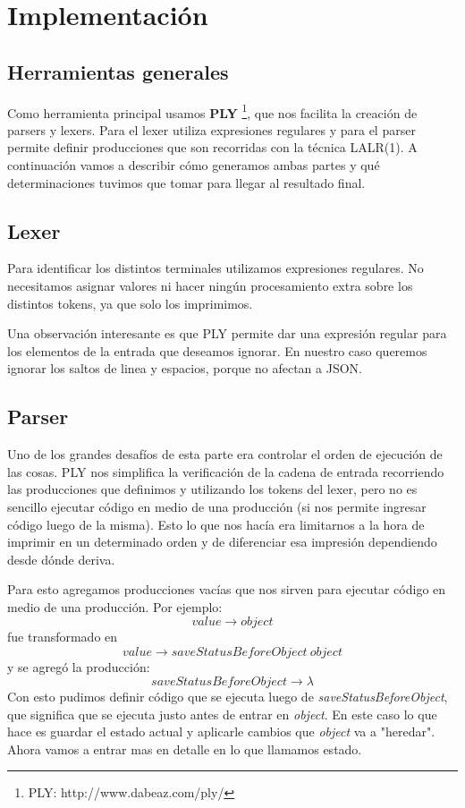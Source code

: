\section{Implementación}

\subsection{Herramientas generales}
Como herramienta principal usamos \textbf{PLY} \footnote{PLY: http://www.dabeaz.com/ply/}, que nos facilita la creación de parsers y lexers. Para el lexer utiliza expresiones regulares y para el parser permite definir producciones que son recorridas con la técnica LALR(1). A continuación vamos a describir cómo generamos ambas partes y qué determinaciones tuvimos que tomar para llegar al resultado final.

\subsection{Lexer}
Para identificar los distintos terminales utilizamos expresiones regulares. No necesitamos asignar valores ni hacer ningún procesamiento extra sobre los distintos tokens, ya que solo los imprimimos.

Una observación interesante es que PLY permite dar una expresión regular para los elementos de la entrada que deseamos ignorar. En nuestro caso queremos ignorar los saltos de linea y espacios, porque no afectan a JSON.

\subsection{Parser}
Uno de los grandes desafíos de esta parte era controlar el orden de ejecución de las cosas. PLY nos simplifica la verificación de la cadena de entrada recorriendo las producciones que definimos y utilizando los tokens del lexer, pero no es sencillo ejecutar código en medio de una producción (si nos permite ingresar código luego de la misma). Esto lo que nos hacía era limitarnos a la hora de imprimir en un determinado orden y de diferenciar esa impresión dependiendo desde dónde deriva.

Para esto agregamos producciones vacías que nos sirven para ejecutar código en medio de una producción. Por ejemplo:
$$value \xrightarrow{} object$$
fue transformado en
$$value \xrightarrow{} saveStatusBeforeObject\ object$$
y se agregó la producción:
$$saveStatusBeforeObject \xrightarrow{} \lambda$$
Con esto pudimos definir código que se ejecuta luego de \textit{saveStatusBeforeObject}, que significa que se ejecuta justo antes de entrar en \textit{object}. En este caso lo que hace es guardar el estado actual y aplicarle cambios que \textit{object} va a "heredar". Ahora vamos a entrar mas en detalle en lo que llamamos estado.

